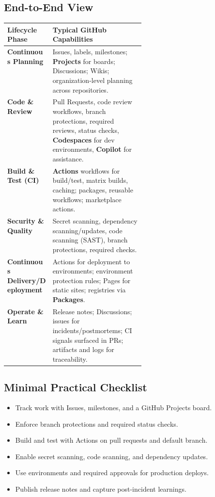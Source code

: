 \documentclass[11pt]{article}
\renewcommand{\cmark}{\textcolor{ok}{\ding{51}}}
\providecommand{\term}[1]{\textbf{#1}}
\newcommand{\gh}{GitHub}
\begin{document}
\subsection{End-to-End View}
\begin{tabularx}{\linewidth}{@{}>{\raggedright\arraybackslash}p{0.33\linewidth} >{\raggedright\arraybackslash}X@{}}
\toprule
\textbf{Lifecycle Phase} & \textbf{Typical \gh{} Capabilities} \\
\midrule
\term{Continuous Planning} & Issues, labels, milestones; \textbf{Projects} for boards; Discussions; Wikis; organization-level planning across repositories. \\
\term{Code \& Review} & Pull Requests, code review workflows, branch protections, required reviews, status checks, \textbf{Codespaces} for dev environments, \textbf{Copilot} for assistance. \\
\term{Build \& Test (CI)} & \textbf{Actions} workflows for build/test, matrix builds, caching; packages, reusable workflows; marketplace actions. \\
\term{Security \& Quality} & Secret scanning, dependency scanning/updates, code scanning (SAST), branch protections, required checks. \\
\term{Continuous Delivery/Deployment} & Actions for deployment to environments; environment protection rules; Pages for static sites; registries via \textbf{Packages}. \\
\term{Operate \& Learn} & Release notes; Discussions; issues for incidents/postmortems; CI signals surfaced in PRs; artifacts and logs for traceability. \\
\bottomrule
\end{tabularx}

\subsection{Minimal Practical Checklist}
\begin{itemize}
  \item \cmark{} Track work with Issues, milestones, and a \gh{} Projects board.
  \item \cmark{} Enforce branch protections and required status checks.
  \item \cmark{} Build and test with Actions on pull requests and default branch.
  \item \cmark{} Enable secret scanning, code scanning, and dependency updates.
  \item \cmark{} Use environments and required approvals for production deploys.
  \item \cmark{} Publish release notes and capture post-incident learnings.
\end{itemize}
\end{document}
